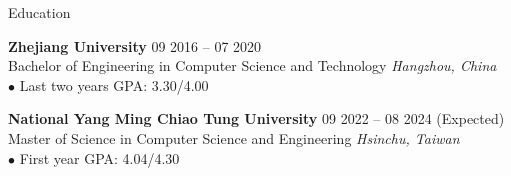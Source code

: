\documentclass{resume}
\begin{document}

\begin{rSection}{Education}

{\bf Zhejiang University} \hfill {09 2016 -- 07 2020}\\
{Bachelor of Engineering in Computer Science and Technology} \hfill \textit{Hangzhou, China}\\
$\bullet$ Last two years GPA: 3.30/4.00

{\bf National Yang Ming Chiao Tung University} \hfill {09 2022 -- 08 2024 (Expected)}\\
{Master of Science in Computer Science and Engineering} \hfill \textit{Hsinchu, Taiwan}\\
$\bullet$ First year GPA: 4.04/4.30

\end{rSection}

\end{document}
